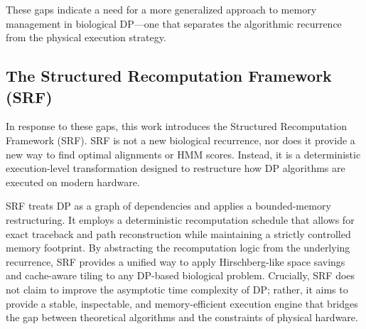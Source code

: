 These gaps indicate a need for a more generalized approach to memory management in biological DP---one that separates the algorithmic recurrence from the physical execution strategy.



\subsection{The Structured Recomputation Framework (SRF)}
In response to these gaps, this work introduces the Structured Recomputation Framework (SRF). SRF is not a new biological recurrence, nor does it provide a new way to find optimal alignments or HMM scores. Instead, it is a deterministic execution-level transformation designed to restructure how DP algorithms are executed on modern hardware.

SRF treats DP as a graph of dependencies and applies a bounded-memory restructuring. It employs a deterministic recomputation schedule that allows for exact traceback and path reconstruction while maintaining a strictly controlled memory footprint. By abstracting the recomputation logic from the underlying recurrence, SRF provides a unified way to apply Hirschberg-like space savings and cache-aware tiling to any DP-based biological problem. Crucially, SRF does not claim to improve the asymptotic time complexity of DP; rather, it aims to provide a stable, inspectable, and memory-efficient execution engine that bridges the gap between theoretical algorithms and the constraints of physical hardware.
